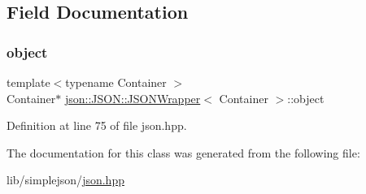 \subsection{Field Documentation}
\mbox{\label{classjson_1_1_j_s_o_n_1_1_j_s_o_n_wrapper_ab17f9cb0bc7be00173c3fdd75d2d0b73}} 
\subsubsection{\texorpdfstring{object}{object}}
{\footnotesize\ttfamily template$<$typename Container $>$ \\
Container$\ast$ \mbox{\hyperlink{classjson_1_1_j_s_o_n_1_1_j_s_o_n_wrapper}{json\+::\+J\+S\+O\+N\+::\+J\+S\+O\+N\+Wrapper}}$<$ Container $>$\+::object\hspace{0.3cm}{\ttfamily [private]}}



Definition at line 75 of file json.\+hpp.



The documentation for this class was generated from the following file\+:\begin{DoxyCompactItemize}
\item 
lib/simplejson/\mbox{\hyperlink{lib_2simplejson_2json_8hpp}{json.\+hpp}}\end{DoxyCompactItemize}
